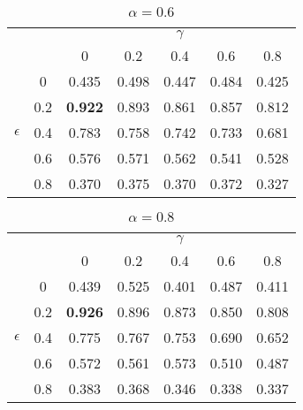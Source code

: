 \documentclass[12pt]{article}
\begin{document}
\vspace{2ex}
\begin{table}[]
\centering
\caption{$\alpha = 0.6$}
\label{}
\begin{tabular}{|cc|ccccc|}
\hline
            &     &                &       & $\gamma$ &       &       \\ %
            &     & 0              & 0.2   & 0.4      & 0.6   & 0.8   \\ \hline
            & 0   & 0.435          & 0.498 & 0.447    & 0.484 & 0.425 \\ %
            & 0.2 & \textbf{0.922} & 0.893 & 0.861    & 0.857 & 0.812 \\ %
 $\epsilon$ & 0.4 & 0.783          & 0.758 & 0.742    & 0.733 & 0.681 \\ %
            & 0.6 & 0.576          & 0.571 & 0.562    & 0.541 & 0.528 \\ %
            & 0.8 & 0.370          & 0.375 & 0.370    & 0.372 & 0.327 \\ \hline
\end{tabular}
\end{table}

\vspace{2ex}
\begin{table}[]
\centering
\caption{$\alpha = 0.8$}
\label{}
\begin{tabular}{|cc|ccccc|}
\hline
            &     &                &       & $\gamma$ &       &       \\ %
            &     & 0              & 0.2   & 0.4      & 0.6   & 0.8   \\ \hline
            & 0   & 0.439          & 0.525 & 0.401    & 0.487 & 0.411 \\ %
            & 0.2 & \textbf{0.926} & 0.896 & 0.873    & 0.850 & 0.808 \\ %
 $\epsilon$ & 0.4 & 0.775          & 0.767 & 0.753    & 0.690 & 0.652 \\ %
            & 0.6 & 0.572          & 0.561 & 0.573    & 0.510 & 0.487 \\ %
            & 0.8 & 0.383          & 0.368 & 0.346    & 0.338 & 0.337 \\ \hline
\end{tabular}
\end{table}
\end{document}
